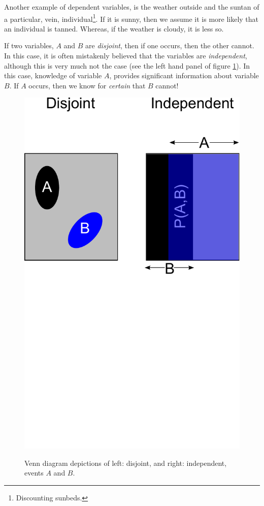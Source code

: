 \documentclass[11pt,fullpage]{book}
\begin{document}
Another example of dependent variables, is the weather outside and the suntan of a particular, vein, individual\footnote{Discounting sunbeds.}. If it is sunny, then we assume it is more likely that an individual is tanned. Whereas, if the weather is cloudy, it is less so.

If two variables, $A$ and $B$ are \textit{disjoint}, then if one occurs, then the other cannot. In this case, it is often mistakenly believed that the variables are \textit{independent}, although this is very much not the case (see the left hand panel of figure \ref{fig:Probability_VennIndependence}). In this case, knowledge of variable $A$, provides significant information about variable $B$. If $A$ occurs, then we know for \textit{certain} that $B$ cannot!

\begin{figure}
\centering
\scalebox{0.4} 
{\includegraphics{Probability_VennIndependence.pdf}}
\caption{Venn diagram depictions of left: disjoint, and right: independent, events $A$ and $B$.}\label{fig:Probability_VennIndependence}
\end{figure}
\end{document}
